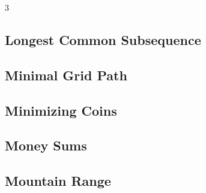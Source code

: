 \documentclass[8pt]{extarticle}
\begin{document}
\begin{multicols*}{3}
\subsection{Longest Common Subsequence}
\begin{caixaenunciado}

\end{caixaenunciado}
\vspace{0.3cm}


\subsection{Minimal Grid Path}
\begin{caixaenunciado}

\end{caixaenunciado}
\vspace{0.3cm}


\subsection{Minimizing Coins}
\begin{caixaenunciado}

\end{caixaenunciado}
\vspace{0.3cm}


\subsection{Money Sums}
\begin{caixaenunciado}

\end{caixaenunciado}
\vspace{0.3cm}


\subsection{Mountain Range}
\begin{caixaenunciado}

\end{caixaenunciado}
\vspace{0.3cm}



\end{multicols*}
\end{document}
